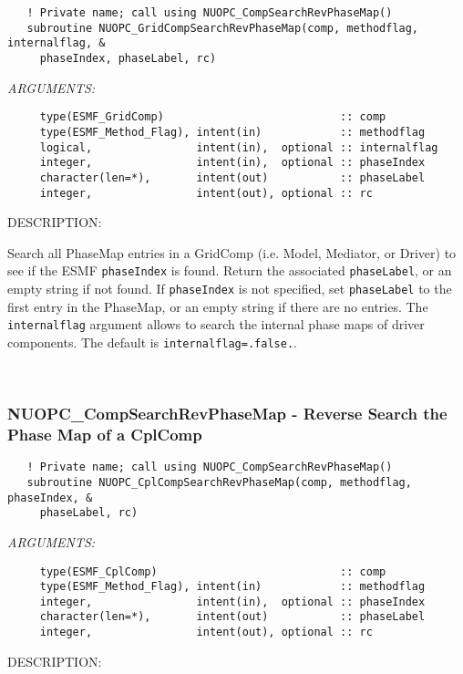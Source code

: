 \begin{verbatim}   ! Private name; call using NUOPC_CompSearchRevPhaseMap()
   subroutine NUOPC_GridCompSearchRevPhaseMap(comp, methodflag, internalflag, &
     phaseIndex, phaseLabel, rc)\end{verbatim}{\em ARGUMENTS:}
\begin{verbatim}     type(ESMF_GridComp)                           :: comp
     type(ESMF_Method_Flag), intent(in)            :: methodflag
     logical,                intent(in),  optional :: internalflag
     integer,                intent(in),  optional :: phaseIndex
     character(len=*),       intent(out)           :: phaseLabel
     integer,                intent(out), optional :: rc \end{verbatim}
{\sf DESCRIPTION:\\ }


   Search all PhaseMap entries in a GridComp (i.e. Model, Mediator, or Driver)
   to see if the ESMF {\tt phaseIndex} is found. Return the associated
   {\tt phaseLabel}, or an empty string if not found. If {\tt phaseIndex} is not
   specified, set {\tt phaseLabel} to the first entry in the PhaseMap, or 
   an empty string if there are no entries. The {\tt internalflag} argument 
   allows to search the internal phase maps of driver components. The default
   is {\tt internalflag=.false.}. 
 
\mbox{}\hrulefill\ 
 
\subsubsection [NUOPC\_CompSearchRevPhaseMap] {NUOPC\_CompSearchRevPhaseMap - Reverse Search the Phase Map of a CplComp}


\begin{verbatim}   ! Private name; call using NUOPC_CompSearchRevPhaseMap()
   subroutine NUOPC_CplCompSearchRevPhaseMap(comp, methodflag, phaseIndex, &
     phaseLabel, rc)\end{verbatim}{\em ARGUMENTS:}
\begin{verbatim}     type(ESMF_CplComp)                            :: comp
     type(ESMF_Method_Flag), intent(in)            :: methodflag
     integer,                intent(in),  optional :: phaseIndex
     character(len=*),       intent(out)           :: phaseLabel
     integer,                intent(out), optional :: rc \end{verbatim}
{\sf DESCRIPTION:\\ }


